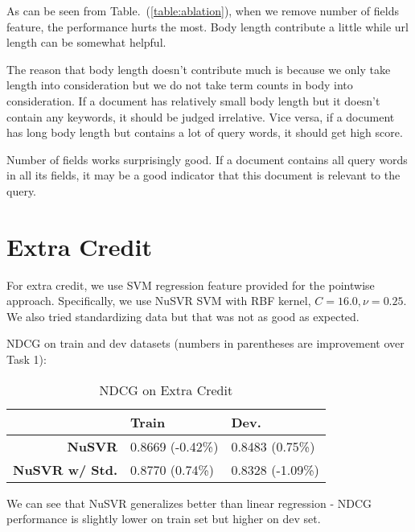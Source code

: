 \documentclass{article}
\begin{document}
As can be seen from Table.~(\ref{table:ablation}), when we remove number of fields feature, the performance hurts the most. Body length contribute a little while url length can be somewhat helpful.

The reason that body length doesn't contribute much is because we only take length into consideration but we do not take term counts in body into consideration. If a document has relatively small body length but it doesn't contain any keywords, it should be judged irrelative. Vice versa, if a document has long body length but contains a lot of query words, it should get high score.

Number of fields works surprisingly good. If a document contains all query words in all its fields, it may be a good indicator that this document is relevant to the query.

\section{Extra Credit}

For extra credit, we use SVM regression feature provided for the pointwise approach.
Specifically, we use NuSVR SVM with RBF kernel, $C=16.0,\nu=0.25$. We also tried standardizing data but that was not as good as expected.

NDCG on train and dev datasets (numbers in parentheses are improvement over Task 1):

\begin{table}[!htb]
    \centering
    \begin{tabular}{| r | l | l |}
        \hline
        & \textbf{Train} & \textbf {Dev.} \\
        \hline
        \textbf{NuSVR} & 0.8669 (-0.42\%) & 0.8483 (0.75\%) \\
        \hline
        \textbf{NuSVR w/ Std.} & 0.8770 (0.74\%) & 0.8328 (-1.09\%) \\
        \hline
    \end{tabular}
    \caption{NDCG on Extra Credit}
\end{table}

We can see that NuSVR generalizes better than linear regression - NDCG performance is slightly lower on train set but higher on dev set.
\end{document}
